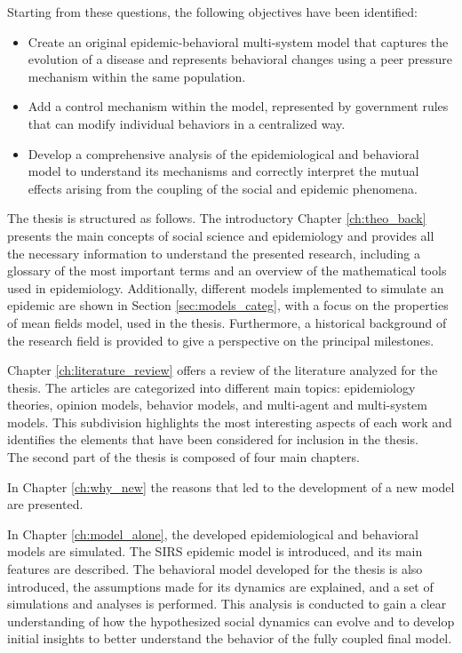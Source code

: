 Starting from these questions, the following objectives have been identified:
\begin{itemize}
	\item Create an original epidemic-behavioral multi-system model that captures the evolution of a disease and represents behavioral changes using a peer pressure mechanism within the same population.
	\item Add a control mechanism within the model, represented by government rules that can modify individual behaviors in a centralized way.
	\item Develop a comprehensive analysis of the epidemiological and behavioral model to understand its mechanisms and correctly interpret the mutual effects arising from the coupling of the social and epidemic phenomena.
\end{itemize}
The thesis is structured as follows. The introductory Chapter \ref{ch:theo_back} presents the main concepts of social science and epidemiology and provides all the necessary information to understand the presented research, including a glossary of the most important terms and an overview of the mathematical tools used in epidemiology. Additionally,  different models implemented to simulate an epidemic are shown in Section \ref{sec:models_categ}, with a focus on the properties of mean fields model, used in the thesis. Furthermore, a historical background of the research field is provided to give a perspective on the principal milestones.

Chapter \ref{ch:literature_review} offers a review of the literature analyzed for the thesis. The articles are categorized into different main topics: epidemiology theories, opinion models, behavior models, and multi-agent and multi-system models. This subdivision highlights the most interesting aspects of each work and identifies the elements that have been considered for inclusion in the thesis.\\


\noindent The second part of the thesis is composed of four main chapters.

In Chapter \ref{ch:why_new} the reasons that led to the development of a new model are presented.

In Chapter \ref{ch:model_alone}, the developed epidemiological and behavioral models are simulated. The SIRS epidemic model is introduced, and its main features are described. The behavioral model developed for the thesis is also introduced, the assumptions made for its dynamics are explained, and a set of simulations and analyses is performed. This analysis is conducted to gain a clear understanding of how the hypothesized social dynamics can evolve and to develop initial insights to better understand the behavior of the fully coupled final model.

